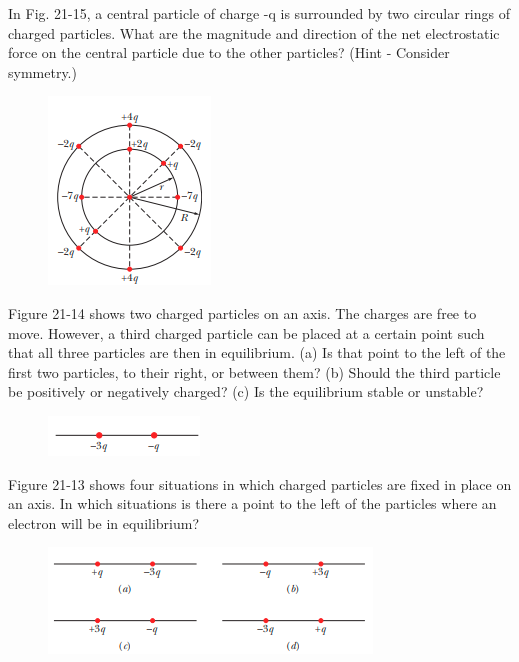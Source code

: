\documentclass[11pt]{exam}
\begin{document}
\begin{questions}
\addpoints
\question[10] In Fig. 21-15, a central particle of charge -q is surrounded by two circular rings of charged particles. What are the magnitude and direction of the net electrostatic force on the central particle due to the other particles? (Hint - Consider symmetry.)\begin{figure}[H]
\centering
\includegraphics[scale=0.8]{assets/Halliday_ch21q5.png}
\end{figure}
\newpage

\addpoints
\question[10] Figure 21-14 shows two charged particles on an axis. The charges are free to move. However, a third charged particle can be placed at a certain point such that all three particles are then in equilibrium. (a) Is that point to the left of the first two particles, to their right, or between them? (b) Should the third particle be positively or negatively charged? (c)  Is the equilibrium stable or unstable?\begin{figure}[H]
\centering
\includegraphics[scale=0.8]{assets/Halliday_ch21q4.png}
\end{figure}
\newpage

\addpoints
\question[10] Figure 21-13 shows four situations in which charged particles are fixed in place on an axis. In which situations is there a point to the left of the particles where an electron will be in equilibrium?\begin{figure}[H]
\centering
\includegraphics[scale=0.8]{assets/Halliday_ch21q3.png}
\end{figure}
\newpage





\end{questions}
\end{document}
